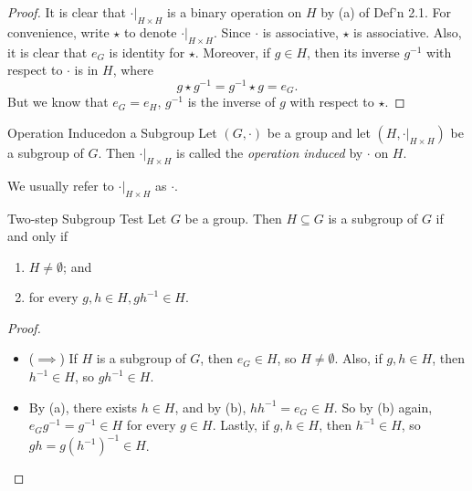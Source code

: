 \documentclass[pmath347]{subfiles}
\begin{document}
    \begin{proof}
        It is clear that $\cdot|_{H\times H}$ is a binary operation on $H$ by (a) of Def'n 2.1. For convenience, write $\star$ to denote $\cdot|_{H\times H}$. Since $\cdot$ is associative, $\star$ is associative. Also, it is clear that $e_G$ is identity for $\star$. Moreover, if $g\in H$, then its inverse $g^{-1} $ with respect to $\cdot$ is in $H$, where
        \begin{equation*}
            g\star g^{-1} = g^{-1} \star g = e_G.
        \end{equation*}
        But we know that $e_G=e_H$, $g^{-1} $ is the inverse of $g$ with respect to $\star$.
    \end{proof}

    \begin{definition}{Operation Induced}{on a Subgroup}
        Let $\left( G,\cdot \right)$ be a group and let $\left( H,\cdot|_{H\times H} \right)$ be a subgroup of $G$. Then $\cdot|_{H\times H}$ is called the \emph{operation induced} by $\cdot$ on $H$.
    \end{definition}

    We usually refer to $\cdot|_{H\times H}$ as $\cdot$.

    \clearpage
    \begin{prop}{Two-step Subgroup Test}
        Let $G$ be a group. Then $H\subseteq G$ is a subgroup of $G$ if and only if
        \begin{enumerate}
            \item $H\neq\emptyset$; and
            \item for every $g,h\in H, gh^{-1} \in H$.
        \end{enumerate}
    \end{prop}

    \begin{proof}
        \begin{itemize}
            \item ($\implies$) If $H$ is a subgroup of $G$, then $e_G\in H$, so $H\neq\emptyset$. Also, if $g,h\in H$, then $h^{-1} \in H$, so $gh^{-1} \in H$. \qqqedsym
            \item By (a), there exists $h\in H$, and by (b), $hh^{-1} = e_G\in H$. So by (b) again, $e_Gg^{-1} = g^{-1} \in H$ for every $g\in H$. Lastly, if $g,h\in H$, then $h^{-1} \in H$, so $gh = g\left( h^{-1}  \right) ^{-1} \in H$. \qqedsym
        \end{itemize} 
    \end{proof}
\end{document}
